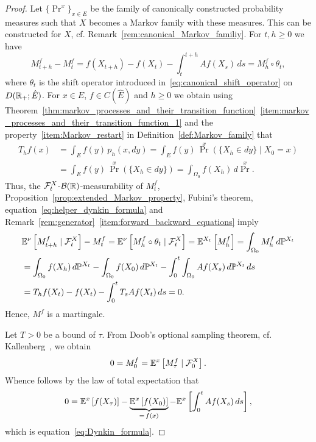 \documentclass[../Master.tex]{subfiles}
\begin{document}
\begin{proof}
  Let \({\{\Pr^x\}}_{x \in E}\) be the family of canonically constructed probability measures such that \(X\) becomes a Markov family with these measures. This can be constructed for \(X\), cf. Remark~\ref{rem:canonical_Markov_familiy}.
  For \(t, h \ge 0\) we have
  \begin{equation*}
    M_{t + h}^f - M_t^f = f(X_{t + h}) - f(X_t) - \int_t^{t + h} A f(X_s) \, ds  = M_h^f \circ \theta_t,
  \end{equation*}
  where \(\theta_t\) is the shift operator introduced in~\eqref{eq:canonical_shift_operator} on \(D(\mathbb{R}_+; \hat{E})\).
  For \(x \in \hat{E}\), \(f \in C(\hat{E})\) and \(h \ge 0\) we obtain using Theorem~\ref{thm:markov_processes_and_their_transition_function}~\ref{item:markov_processes_and_their_transition_function_1} and the property~\ref{item:Markov_restart} in Definition~\ref{def:Markov_family} that
  \begin{equation}\label{eq:helper_dynkin_formula}
    \begin{aligned}
      T_h f(x) &= \int_E f(y) \, p_h (x, dy) = \int_E f(y) \, \Pr^x (\{X_h \in dy\} \mid X_0 = x) \\
      &= \int_E f(y) \, \Pr^x(\{X_h \in dy\}) = \int_{\Omega_0} f(X_h) \, d \Pr^x.
    \end{aligned}
  \end{equation}
  Thus, the \(\mathcal{F}^X_t\)-\(\mathcal{B}(\mathbb{R})\)-measurability of \(M_t^f\), Proposition~\ref{prop:extended_Markov_property}, Fubini's theorem, equation~\eqref{eq:helper_dynkin_formula} and Remark~\ref{rem:generator}~\ref{item:forward_backward_equations} imply
  \begin{equation*}
    \begin{aligned}
      &\mathbb{E}^\nu \left[ M_{t + h}^f \mid \mathcal{F}^X_t \right] - M_t^f = \mathbb{E}^\nu \left[ M_h^f \circ \theta_t \mid \mathcal{F}^X_t \right] = \mathbb{E}^{X_t} \left[M_h^f \right] = \int_{\Omega_0} M_h^f \, d \mathbb{P}^{X_t} \\
      &= \int_{\Omega_0} f(X_h) \, d \mathbb{P}^{X_t} - \int_{\Omega_0} f(X_0) \, d \mathbb{P}^{X_t} - \int_0^t \int_{\Omega_0} Af(X_s) \, d \mathbb{P}^{X_t} \, ds \\
      &= T_h f(X_t) - f(X_t) - \int_0^t T_s A f(X_t) \, ds = 0.
    \end{aligned}
  \end{equation*}
  Hence, \(M^f\) is a martingale.
  
  Let \(T > 0\) be a bound of \(\tau{}\). From Doob's optional sampling theorem, cf. Kallenberg~\cite[Theorem 7.12]{kallenberg_foundations_2002}, we obtain 
  \begin{equation*}
    0 = M^f_0 = \mathbb{E}^x \left[M^f_\tau \mid \mathcal{F}^X_0 \right].
  \end{equation*}
  Whence follows by the law of total expectation that
  \begin{equation}
    0 = \mathbb{E}^x \left[ f (X_\tau)\right] - \underbrace{\mathbb{E}^x \left[f(X_0)\right]}_{= \, f(x)} - \mathbb{E}^x \left[\int_0^t A f(X_s) \, ds \right],
  \end{equation}
  which is equation~\eqref{eq:Dynkin_formula}.
\end{proof}
\end{document}
